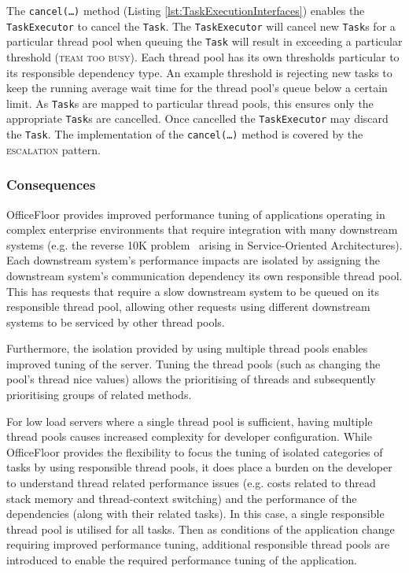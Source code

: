 \documentclass[prodmode]{style/acmlarge}
\begin{document}
The \texttt{cancel(\ldots)} method (Listing \ref{lst:TaskExecutionInterfaces})
enables the \texttt{TaskExecutor} to cancel the \texttt{Task}. The
\texttt{Task\-Executor} will cancel new \texttt{Task}s for a particular thread
pool when queuing the \texttt{Task} will result in exceeding a particular
threshold (\textsc{team too busy}).  Each thread pool has its own thresholds
particular to its responsible dependency type.  An example threshold is
rejecting new tasks to keep the running average wait time for the thread pool's
queue below a certain limit.  As \texttt{Task}s are mapped to particular thread
pools, this ensures only the appropriate \texttt{Task}s are cancelled.
Once cancelled the \texttt{TaskExecutor} may discard the \texttt{Task}.  The
implementation of the \texttt{can\-cel(\ldots)} method is covered by the
\textsc{escalation} pattern.


\subsubsection*{Consequences}

OfficeFloor provides improved performance tuning of applications operating in
complex enterprise environments that require integration with many downstream
systems (e.g. the reverse 10K problem~\cite{reverse-ten-k-problem} arising in
Service-Oriented Architectures).  Each downstream system's performance impacts
are isolated by assigning the downstream system's communication dependency its
own responsible thread pool.  This has requests that require a slow downstream
system to be queued on its responsible thread pool, allowing other requests
using different downstream systems to be serviced by other thread pools.

Furthermore, the isolation provided by using multiple thread pools enables
improved tuning of the server.  Tuning the thread pools (such as changing the
pool's thread nice values) allows the prioritising of threads and subsequently
prioritising groups of related methods.

For low load servers where a single thread pool is sufficient, having multiple
thread pools causes increased complexity for developer configuration.  While
OfficeFloor provides the flexibility to focus the tuning of isolated categories
of tasks by using responsible thread pools, it does place a burden on the
developer to understand thread related performance issues (e.g. costs related to
thread stack memory and thread-context switching) and the performance of the
dependencies (along with their related tasks).  In this case, a single
responsible thread pool is utilised for all tasks.  Then as conditions of the
application change requiring improved performance tuning, additional responsible
thread pools are introduced to enable the required performance tuning of the
application.
\end{document}
